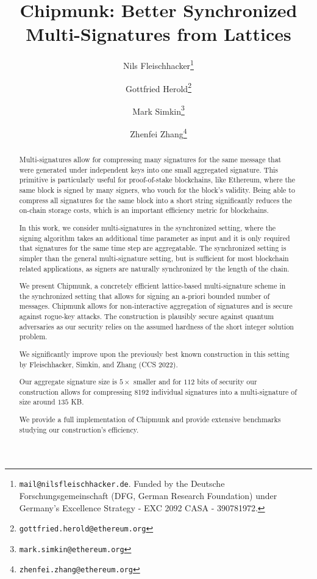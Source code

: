 \documentclass[11pt]{llncs}
\title{Chipmunk: Better Synchronized Multi-Signatures from Lattices}
\author{
 	Nils Fleischhacker\inst{1}\thanks{\texttt{mail@nilsfleischhacker.de}. Funded by the Deutsche Forschungsgemeinschaft (DFG, German Research Foundation) under Germany's Excellence Strategy - EXC 2092 CASA - 390781972.}%
 	\and
 	Gottfried Herold\inst{2}\thanks{\texttt{gottfried.herold@ethereum.org}}%
 	\and
 	Mark Simkin\inst{2}\thanks{\texttt{mark.simkin@ethereum.org}}%
   \and
   Zhenfei Zhang\inst{2}\thanks{\texttt{zhenfei.zhang@ethereum.org}}%
}
\institute{
	 Ruhr University Bochum
	 \and
	 Ethereum Foundation
}
\newif\ifcameraready
\begin{document}
\pagestyle{plain}

\maketitle
\noindent
\makebox[\linewidth]{\small \today}

\begin{abstract}
Multi-signatures allow for compressing many signatures for the same message that were generated under independent keys into one small aggregated signature. 
This primitive is particularly useful for proof-of-stake blockchains, like Ethereum, where the same block is signed by many signers, who vouch for the block's validity.
Being able to compress all signatures for the same block into a short string significantly reduces the on-chain storage costs, which is an important efficiency metric for blockchains.

In this work, we consider multi-signatures in the synchronized setting, where the signing algorithm takes an additional time parameter as input and it is only required that signatures for the same time step are aggregatable.
The synchronized setting is simpler than the general multi-signature setting, but is sufficient for most blockchain related applications, as signers are naturally synchronized by the length of the chain.

We present Chipmunk, a concretely efficient lattice-based multi-signature scheme in the synchronized setting that allows for signing an a-priori bounded number of messages.
Chipmunk allows for non-interactive aggregation of signatures and is secure against rogue-key attacks.
The construction is plausibly secure against quantum adversaries as our security relies on the assumed hardness of the short integer solution problem.

We significantly improve upon the previously best known construction in this setting by Fleischhacker, Simkin, and Zhang (CCS 2022).
\ifcameraready
Our aggregate signature size is $5 \times$ smaller and for $112$ bits of security our construction allows for compressing 8192 individual signatures into a multi-signature of size less than $200$ KB.
\else
Our aggregate signature size is $5 \times$ smaller and for $112$ bits of security our construction allows for compressing 8192 individual signatures into a multi-signature of size around $135$ KB.
\fi
We provide a full implementation of Chipmunk and provide extensive benchmarks studying our construction's efficiency.

\end{abstract}
\end{document}

